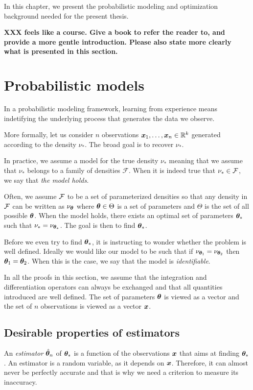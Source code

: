 In this chapter, we present the probabilistic modeling and
optimization background needed for the present thesis.

\textbf{XXX feels like a course. Give a book to refer the reader to, and provide a more gentle introduction. Please also state more clearly what is presented in this section.}

\section{Probabilistic models}
In a probabilistic modeling framework, learning from experience means indetifying the underlying process that generates the data we observe.

More formally, let us consider $n$ observations $\boldsymbol{x}_1, \dots, \boldsymbol{x}_n \in \mathbb{R}^k$ generated according to the density $\nu_*$.  The broad goal is to recover $\nu_*$.

In practice, we assume a model for the true density $\nu_*$ meaning that we
assume that $\nu_*$ belongs to a family of densities $\mathcal{F}$.
When it is indeed true that $\nu_* \in \mathcal{F}$, we say that \emph{the model holds}.

Often, we assume $\mathcal{F}$ to be a set of parameterized densities so
that any density in $\mathcal{F}$ can be written as $\nu_{\boldsymbol{\theta}}$ where
$\boldsymbol{\theta} \in \Theta$ is a set of parameters and $\Theta$ is the set of all
possible $\boldsymbol{\theta}$. When the model holds, there exists an optimal
set of parameters $\boldsymbol{\theta}_*$ such that $\nu_* = \nu_{\boldsymbol{\theta}_*}$. The goal is then
to find $\boldsymbol{\theta}_*$.


Before we even try to find $\boldsymbol{\theta}_*$, it is instructing to wonder whether the
problem is well defined. Ideally we would like our model to be such that if
$\nu_{\boldsymbol{\theta}_1} = \nu_{\boldsymbol{\theta}_2}$ then $\boldsymbol{\theta}_1=\boldsymbol{\theta}_2$.
When this is the case, we say that the model is \emph{identifiable}.

In all the proofs in this section, we assume that the integration and
differentiation operators can always be exchanged and that all quantities
introduced are well defined. The set of parameters $\boldsymbol{\theta}$ is viewed as a
vector and the set of $n$ observations is viewed as a vector $\boldsymbol{x}$.

\subsection{Desirable properties of estimators}
An \emph{estimator} $\hat{\boldsymbol{\theta}}_n$ of $\boldsymbol{\theta}_*$ is a function of the
observations $\boldsymbol{x}$ that aims at finding $\boldsymbol{\theta}_*$.
An estimator is a random variable, as it depends on $\boldsymbol{x}$. Therefore, it can almost never be perfectly accurate and that
is why we need a criterion to measure its inaccuracy.

